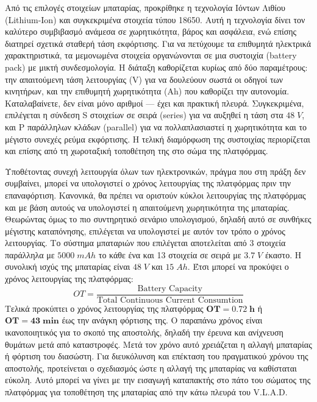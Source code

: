\par Από τις επιλογές στοιχείων μπαταρίας, προκρίθηκε η τεχνολογία Ιόντων Λιθίου (Lithium-Ion) και συγκεκριμένα στοιχεία τύπου 18650. Αυτή η τεχνολογία δίνει τον καλύτερο συμβιβασμό ανάμεσα σε χωρητικότητα, βάρος και ασφάλεια, ενώ επίσης διατηρεί σχετικά σταθερή τάση εκφόρτισης. Για να πετύχουμε τα επιθυμητά ηλεκτρικά χαρακτηριστικά, τα μεμονωμένα στοιχεία οργανώνονται σε μια συστοιχία (battery pack) με μικτή συνδεσμολογία. Η διάταξη καθορίζεται κυρίως από δύο παραμέτρους: την απαιτούμενη τάση λειτουργίας (V) για να δουλεύουν σωστά οι οδηγοί των κινητήρων, και την επιθυμητή χωρητικότητα (Ah) που καθορίζει την αυτονομία. Καταλαβαίνετε, δεν είναι μόνο αριθμοί — έχει και πρακτική πλευρά. Συγκεκριμένα, επιλέγεται η σύνδεση S στοιχείων σε σειρά (series) για να αυξηθεί η τάση στα $48\;V$, και P παράλληλων κλάδων (parallel) για να πολλαπλασιαστεί η χωρητικότητα και το μέγιστο συνεχές ρεύμα εκφόρτισης. Η τελική διαμόρφωση της συστοιχίας περιορίζεται και επίσης από τη χωροταξική τοποθέτηση της στο σώμα της πλατφόρμας.

\par Υποθέτοντας συνεχή λειτουργία όλων των ηλεκτρονικών, πράγμα που στη πράξη δεν συμβαίνει, μπορεί να υπολογιστεί ο χρόνος λειτουργίας της πλατφόρμας πριν την επαναφόρτιση. Κανονικά, θα πρέπει να οριστούν κύκλοι λειτουργίας της πλατφόρμας και με βάση αυτούς να υπολογιστεί η απαιτούμενη χωρητικότητα της μπαταρίας. Θεωρώντας όμως το πιο συντηρητικό σενάριο υπολογισμού, δηλαδή αυτό σε συνθήκες μέγιστης καταπόνησης, επιλέγεται να υπολογιστεί με αυτόν τον τρόπο ο χρόνος λειτουργίας. Το σύστημα μπαταριών που επιλέγεται αποτελείται από 3 στοιχεία παράλληλα με $5000\;mAh$ το κάθε ένα και 13 στοιχεία σε σειρά με $3.7\;V$ έκαστο. Η συνολική ισχύς της μπαταρίας είναι $48\;V$ και $15\;Ah$. Έτσι μπορεί να προκύψει ο χρόνος λειτουργίας της πλατφόρμας:
\begin{equation}
OT = \frac{\text{Battery Capacity}}{\text{Total Continuous Current Consumtion}}
\end{equation}
Τελικά προκύπτει ο χρόνος λειτουργίας της πλατφόρμας $\boldsymbol{OT = 0.72\; h} $ ή $\boldsymbol{OT = 43\; min}$ έως την ανάγκη φόρτισης της. Ο παραπάνω χρόνος είναι ικανοποιητικός για το σκοπό της αποστολής, δηλαδή την έρευνα και ανίχνευση θυμάτων μετά από καταστροφές. Μετά τον χρόνο αυτό χρειάζεται η αλλαγή μπαταρίας ή φόρτιση του διασώστη. Για διευκόλυνση και επέκταση του πραγματικού χρόνου της αποστολής, προτείνεται ο σχεδιασμός ώστε η αλλαγή της μπαταρίας να καθίσταται εύκολη. Αυτό μπορεί να γίνει με την εισαγωγή καταπακτής στο πάτο του σώματος της πλατφόρμας για τοποθέτηση της μπαταρίας από την κάτω πλευρά του V.L.A.D.